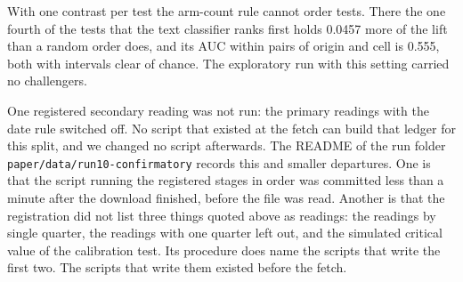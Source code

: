 With one contrast per test the arm-count rule cannot order tests. There the one fourth of the tests that the text classifier ranks first holds 0.0457 more of the lift than a random order does, and its AUC within pairs of origin and cell is 0.555, both with intervals clear of chance. The exploratory run with this setting carried no challengers.

One registered secondary reading was not run: the primary readings with the date rule switched off. No script that existed at the fetch can build that ledger for this split, and we changed no script afterwards. The README of the run folder \texttt{paper/data/run10-confirmatory} records this and smaller departures. One is that the script running the registered stages in order was committed less than a minute after the download finished, before the file was read. Another is that the registration did not list three things quoted above as readings: the readings by single quarter, the readings with one quarter left out, and the simulated critical value of the calibration test. Its procedure does name the scripts that write the first two. The scripts that write them existed before the fetch.

